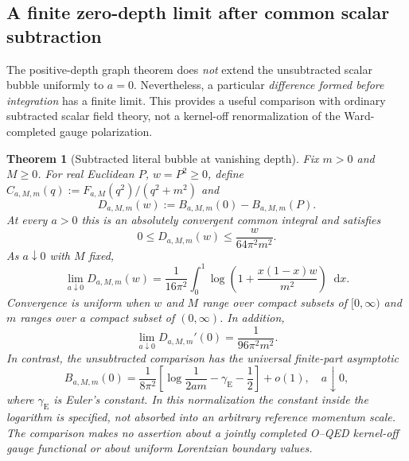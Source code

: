 \documentclass[final,5p,times,twocolumn,numbers,nopreprintline]{elsarticle}
\numberwithin{equation}{section}
\newtheorem{theorem}{Theorem}[section]
\theoremstyle{definition}
\theoremstyle{remark}
\newcommand{\dd}{\mathop{}\!\mathrm d}
\begin{document}
\subsection{A finite zero-depth limit after common scalar subtraction}
\label{sec:OQED-scalar-subtraction}

The positive-depth graph theorem does \emph{not} extend the
unsubtracted scalar bubble uniformly to $a=0$. Nevertheless, a
particular \emph{difference formed before integration} has a
finite limit. This provides a useful comparison with ordinary
subtracted scalar field theory, not a kernel-off renormalization
of the Ward-completed gauge polarization.

\begin{theorem}[Subtracted literal bubble at vanishing depth]
\label{thm:OQED-subtracted-zero-depth}
Fix $m>0$ and $M\geq0$. For real Euclidean $P$, $w=P^2\geq0$,
define $C_{a,M,m}(q):=F_{a,M}(q^2)/(q^2+m^2)$ and
\begin{equation}
 D_{a,M,m}(w):=B_{a,M,m}(0)-B_{a,M,m}(P).
 \label{eq:OQED-subtracted-bubble-def}
\end{equation}
At every $a>0$ this is an absolutely convergent \emph{common}
integral and satisfies
\begin{equation}
 0\leq D_{a,M,m}(w)\leq\frac{w}{64\pi^2m^2}.
 \label{eq:OQED-subtraction-uniform-bound}
\end{equation}
As $a\downarrow0$ with $M$ fixed,
\begin{equation}
 \boxed{\displaystyle
 \lim_{a\downarrow0}D_{a,M,m}(w)
   =\frac1{16\pi^2}\int_0^1
      \log\left(1+\frac{x(1-x)w}{m^2}\right)\dd x.}
 \label{eq:OQED-subtraction-limit}
\end{equation}
Convergence is uniform when $w$ and $M$ range over compact
subsets of $[0,\infty)$ and $m$ ranges over a compact subset of
$(0,\infty)$. In addition,
\begin{equation}
 \lim_{a\downarrow0}D_{a,M,m}'(0)
  =\frac1{96\pi^2m^2}.
 \label{eq:OQED-subtraction-slope-limit}
\end{equation}
In contrast, the \emph{unsubtracted} comparison has the
universal finite-part asymptotic
\begin{equation}
 B_{a,M,m}(0)=\frac1{8\pi^2}
  \left[\log\frac1{2am}-\gamma_{\mathrm E}-\frac12\right]
  +o(1),\quad a\downarrow0,
 \label{eq:OQED-unsubtracted-log-depth}
\end{equation}
where $\gamma_{\mathrm E}$ is Euler's constant. In this
normalization the constant inside the logarithm is specified,
not absorbed into an arbitrary reference momentum scale.
The comparison makes no assertion about a jointly completed
O--QED kernel-off gauge functional or about uniform Lorentzian
boundary values.
\end{theorem}
\end{document}
